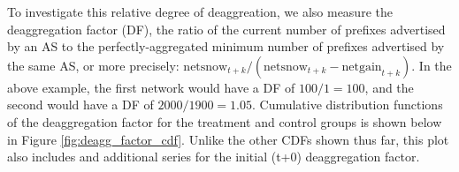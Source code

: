 To investigate this relative degree of deaggreation, we also measure the
deaggregation factor (DF), the ratio of the current number of prefixes
advertised by an AS to the perfectly-aggregated minimum number of
prefixes advertised by the same AS, or more precisely:
$\textrm{netsnow}_{t+k}/(\textrm{netsnow}_{t+k} - \textrm{netgain}_{t+k})$.
In the above example, the first network would have a DF of
$\textrm{100}/\textrm{1} = \textrm{100}$, and the second would have a DF of
$\textrm{2000}/\textrm{1900} = \textrm{1.05}$.  Cumulative distribution
functions of the deaggregation factor for the treatment and control groups is
shown below in Figure \ref{fig:deagg_factor_cdf}. Unlike the other CDFs shown
thus far, this plot also includes and additional series for the initial (t+0)
deaggregation factor.


